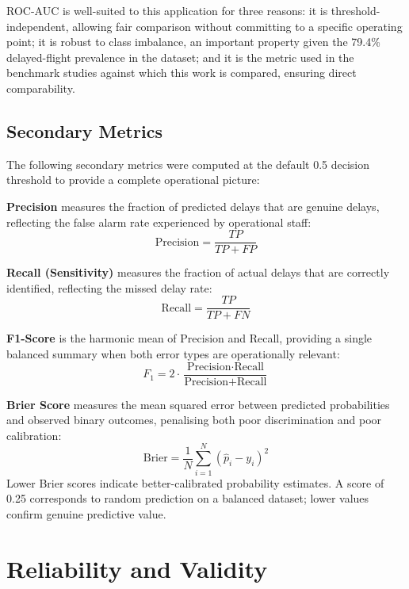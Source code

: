 \documentclass{report}
\begin{document}
ROC-AUC is well-suited to this application for three reasons: it is
threshold-independent, allowing fair comparison without committing to a
specific operating point; it is robust to class imbalance, an important
property given the 79.4\% delayed-flight prevalence in the dataset; and it
is the metric used in the benchmark studies against which this work is
compared, ensuring direct comparability.

\subsection{Secondary Metrics}

The following secondary metrics were computed at the default 0.5 decision
threshold to provide a complete operational picture:

\textbf{Precision} measures the fraction of predicted delays that are genuine
delays, reflecting the false alarm rate experienced by operational staff:
\begin{equation}
\text{Precision} = \frac{TP}{TP + FP}
\end{equation}

\textbf{Recall (Sensitivity)} measures the fraction of actual delays that are
correctly identified, reflecting the missed delay rate:
\begin{equation}
\text{Recall} = \frac{TP}{TP + FN}
\end{equation}

\textbf{F1-Score} is the harmonic mean of Precision and Recall, providing a
single balanced summary when both error types are operationally relevant:
\begin{equation}
F_1 = 2 \cdot \frac{\text{Precision} \cdot \text{Recall}}{\text{Precision} + \text{Recall}}
\end{equation}

\textbf{Brier Score} measures the mean squared error between predicted
probabilities and observed binary outcomes, penalising both poor
discrimination and poor calibration:
\begin{equation}
\text{Brier} = \frac{1}{N} \sum_{i=1}^{N} (\hat{p}_i - y_i)^2
\end{equation}
Lower Brier scores indicate better-calibrated probability estimates.  A
score of 0.25 corresponds to random prediction on a balanced dataset; lower
values confirm genuine predictive value.


\section{Reliability and Validity}
\label{sec:validity}
\end{document}
